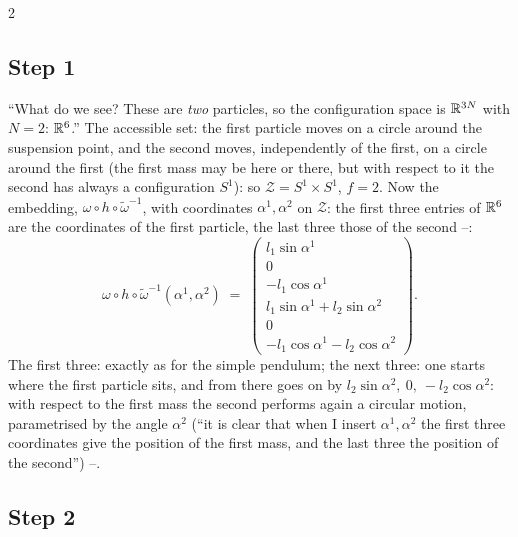 \begin{paracol}{2}
\subsection{Step 1}\label{ssec:pc-d1}

``What do we see? These are \emph{two} particles, so the configuration space is $\mathbb{R}^{3N}$ with $N=2$: $\mathbb{R}^6$.'' The accessible set: the first particle moves on a circle around the suspension point, and the second moves, independently of the first, on a circle around the first (the first mass may be here or there, but with respect to it the second has always a configuration $S^1$): so $\mathcal Z=S^1\times S^1$, $f=2$. Now the embedding, $\omega\circ h\circ\tilde\omega^{-1}$, with coordinates $\alpha^1,\alpha^2$ on $\mathcal Z$: the first three entries of $\mathbb{R}^6$ are the coordinates of the first particle, the last three those of the second --:
\begin{equation}\label{eq:pc-hdouble}
  \omega\circ h\circ\tilde\omega^{-1}(\alpha^1,\alpha^2)\;=\;\begin{pmatrix}l_1\sin\alpha^1\\0\\-l_1\cos\alpha^1\\l_1\sin\alpha^1+l_2\sin\alpha^2\\0\\-l_1\cos\alpha^1-l_2\cos\alpha^2\end{pmatrix}.
\end{equation}
The first three: exactly as for the simple pendulum; the next three: one starts where the first particle sits, and from there goes on by $l_2\sin\alpha^2,\ 0,\ -l_2\cos\alpha^2$: with respect to the first mass the second performs again a circular motion, parametrised by the angle $\alpha^2$ (``it is clear that when I insert $\alpha^1,\alpha^2$ the first three coordinates give the position of the first mass, and the last three the position of the second'') --.

\subsection{Step 2}\label{ssec:pc-d2}


\end{paracol}
